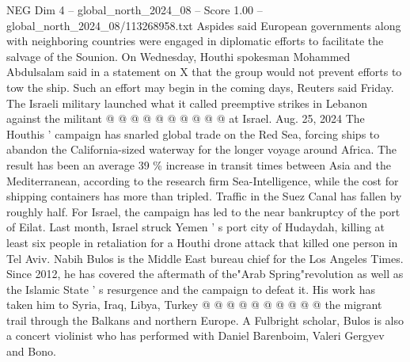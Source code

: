 \begin{textsample}{NEG Dim 4 – global\_north\_2024\_08 – Score 1.00 – global\_north\_2024\_08/113268958.txt}
Aspides said European governments along with neighboring countries were engaged in diplomatic efforts to facilitate the salvage of the Sounion.
On Wednesday, Houthi spokesman Mohammed Abdulsalam said in a statement on X that the group would not prevent efforts to tow the ship.
Such an effort may begin in the coming days, Reuters said Friday.
The Israeli military launched what it called preemptive strikes in Lebanon against the militant @ @ @ @ @ @ @ @ @ @ at Israel.
Aug. 25, 2024 The Houthis ' campaign has snarled global trade on the Red Sea, forcing ships to abandon the California-sized waterway for the longer voyage around Africa.
The result has been an average 39 \% increase in transit times between Asia and the Mediterranean, according to the research firm Sea-Intelligence, while the cost for shipping containers has more than tripled.
Traffic in the Suez Canal has fallen by roughly half.
For Israel, the campaign has led to the near bankruptcy of the port of Eilat.
Last month, Israel struck Yemen ' s port city of Hudaydah, killing at least six people in retaliation for a Houthi drone attack that killed one person in Tel Aviv.
Nabih Bulos is the Middle East bureau chief for the Los Angeles Times.
Since 2012, he has covered the aftermath of the"Arab Spring"revolution as well as the Islamic State ' s resurgence and the campaign to defeat it.
His work has taken him to Syria, Iraq, Libya, Turkey @ @ @ @ @ @ @ @ @ @ the migrant trail through the Balkans and northern Europe.
A Fulbright scholar, Bulos is also a concert violinist who has performed with Daniel Barenboim, Valeri Gergyev and Bono.

\end{textsample}
